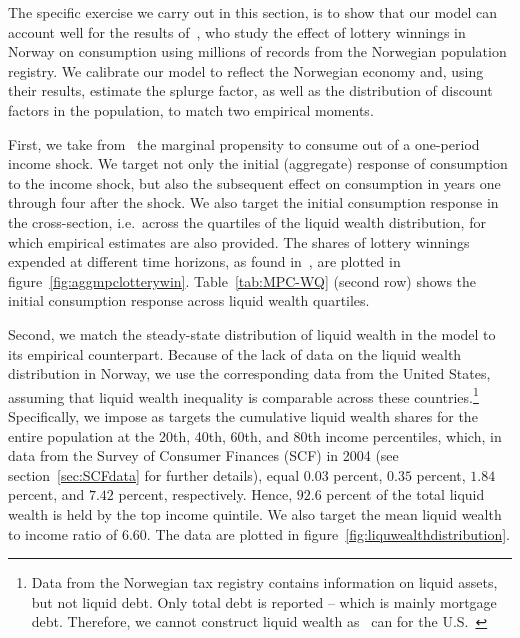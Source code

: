 \documentclass[\latexroot/\projectname]{subfiles}
\begin{document}
The specific exercise we carry out in this section, is to show that our model can account well for the results of~\cite{fagereng-mpc-2021}, who study the effect of lottery winnings in Norway on consumption using millions of records from the Norwegian population registry. We calibrate our model to reflect the Norwegian economy and, using their results, estimate the splurge factor, as well as the distribution of discount factors in the population, to match two empirical moments.

First, we take from~\cite{fagereng-mpc-2021} the marginal propensity to consume out of a one-period income shock. We target not only the initial (aggregate) response of consumption to the income shock, but also the subsequent effect on consumption in years one through four after the shock. We also target the initial consumption response in the cross-section, i.e.\ across the quartiles of the liquid wealth distribution, for which empirical estimates are also provided. The shares of lottery winnings expended at different time horizons, as found in~\cite{fagereng-mpc-2021}, are plotted in figure~\ref{fig:aggmpclotterywin}. Table~\ref{tab:MPC-WQ} (second row) shows the initial consumption response across liquid wealth quartiles.%

Second, we match the steady-state distribution of liquid wealth in the model to its empirical counterpart. Because of the lack of data on the liquid wealth distribution in Norway, we use the corresponding data from the United States, assuming that liquid wealth inequality is comparable across these countries.\footnote{Data from the Norwegian tax registry contains information on liquid assets, but not liquid debt. Only total debt is reported -- which is mainly mortgage debt. Therefore, we cannot construct liquid wealth as~\cite{kaplan2014model} can for the U.S.\ \whenintegrated{\label{foot:liqwealth}}}
Specifically, we impose as targets the cumulative liquid wealth shares for the entire population at the 20th, 40th, 60th, and 80th income percentiles, which, in data from the Survey of Consumer Finances (SCF) in 2004 (see section~\ref{sec:SCFdata} for further details), equal $0.03$ percent, $0.35$ percent, $1.84$ percent, and $7.42$ percent, respectively. Hence, $92.6$ percent of the total liquid wealth is held by the top income quintile. We also target the mean liquid wealth to income ratio of 6.60. The data are plotted in figure~\ref{fig:liquwealthdistribution}.
\end{document}
